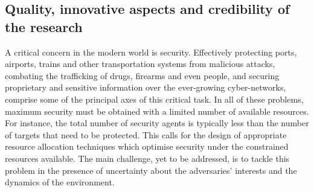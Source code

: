 
\subsection{Quality, innovative aspects and credibility of the research} %
\label{sec:quality}

A critical concern in the modern world is security. Effectively protecting ports, airports, trains and other transportation systems from malicious attacks, combating the trafficking of drugs, firearms and even people, and securing proprietary and sensitive information over the ever-growing cyber-networks, comprise some of the principal axes of this critical task.
 In all of these problems,  maximum security must be obtained with a limited number of available resources. 
For instance, the total number of security agents is typically less than the number of targets that need to be protected. %
This calls for the design of appropriate resource allocation techniques which optimise security under the constrained resources available. The main challenge, yet to be addressed, is to tackle this problem in the presence of uncertainty about the adversaries' interests and the dynamics of the environment.

 

